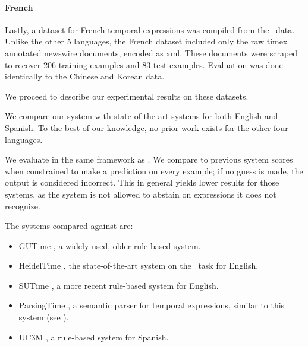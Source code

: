 \paragraph{French}
Lastly, a dataset for French temporal expressions was compiled from the
  \tempeval\ data.
Unlike the other 5 languages, the French dataset included only the raw 
  timex annotated newswire documents, encoded as xml.
These documents were scraped to recover 206 training examples and 83 test
  examples.
Evaluation was done identically to the Chinese and Korean data.

We proceed to describe our experimental results on these datasets.

We compare our system with state-of-the-art systems for both English and
  Spanish.
To the best of our knowledge, no prior work exists for the other four languages.

We evaluate in the same framework as \me.
We compare to 
	previous system scores when constrained to make a prediction on every
	example; if no guess is made, the output is considered incorrect.
This in general yields lower results for those systems,
  as the system is not allowed to
	abstain on expressions it does not recognize.

The systems compared against are:
\begin{itemize}
\item GUTime \cite{key:2010strotgen-temporal}, a widely used, older rule-based
              system.
\item HeidelTime \cite{key:2010strotgen-temporal}, the state-of-the-art
                 system on the \tempeval\ task for English.
\item SUTime \cite{key:2012chang-temporal}, a more recent rule-based
             system for English.
\item ParsingTime \mec, a semantic parser for temporal expressions, similar to
                  this system (see ).
\item UC3M \cite{2010vicente-uc3m}, a rule-based system for
             Spanish.
\end{itemize}

